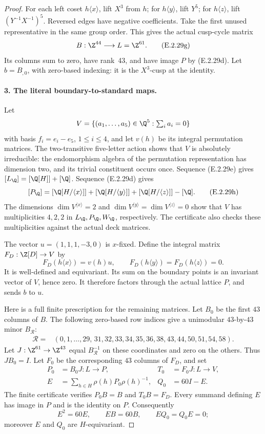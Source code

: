 \begin{proof}
For each left coset \(h\langle x\rangle\), lift \(X^3\)
from \(h\); for \(h\langle y\rangle\), lift \(Y^5\);
for \(h\langle z\rangle\), lift
\((Y^{-1}X^{-1})^5\). Reversed edges have negative
coefficients. Take the first unused representative in the
same group order. This gives the actual cusp-cycle matrix
\[
 B:\Z^{44}\longrightarrow L=\Z^{61}.
 \tag{E.2.29g}
\]
Its columns sum to zero, have rank~43, and have image \(P\)
by (E.2.29d). Let \(b=B_{\!,0}\), with zero-based indexing:
it is the \(X^3\)-cusp at the identity.

\paragraph{3. The literal boundary-to-standard maps.}
Let
\[
 V=\{(a_1,\ldots,a_5)\in\Q^5:\textstyle\sum_i a_i=0\}
\]
with basis \(f_i=e_i-e_5\), \(1\leq i\leq4\), and let
\(v(h)\) be its integral permutation matrices. The
two-transitive five-letter action shows that \(V\) is
absolutely irreducible: the endomorphism algebra of the
permutation representation has dimension two, and its
trivial constituent occurs once. Sequence (E.2.29e) gives
\([L_\Q]=[\Q[H]]+[\Q]\). Sequence (E.2.29d) gives
\[
 [P_\Q]=[\Q[H/\langle x\rangle]]
       +[\Q[H/\langle y\rangle]]
       +[\Q[H/\langle z\rangle]]-[\Q].
 \tag{E.2.29h}
\]
The dimensions \( \dim V^{\langle x\rangle}=2\) and
\(\dim V^{\langle y\rangle}=\dim V^{\langle z\rangle}=0\)
show that \(V\) has multiplicities \(4,2,2\) in
\(L_\Q,P_\Q,W_\Q\), respectively. The certificate also
checks these multiplicities against the actual deck matrices.

The vector \(u=(1,1,1,-3,0)\) is \(x\)-fixed. Define
the integral matrix \(F_D:\Z[D]\to V\) by
\[
 F_D(h\langle x\rangle)=v(h)u,\qquad
 F_D(h\langle y\rangle)=F_D(h\langle z\rangle)=0 .
 \tag{E.2.29i}
\]
It is well-defined and equivariant. Its sum on the boundary
points is an invariant vector of \(V\), hence zero. It
therefore factors through the actual lattice \(P\), and
sends \(b\) to \(u\).

Here is a full finite prescription for the remaining
matrices. Let \(B_0\) be the first \(43\) columns of \(B\).
The following zero-based row indices give a unimodular
\(43\)-by-\(43\) minor \(B_{\mathcal R}\):
\[
 \begin{aligned}
 \mathcal R={}&(0,1,\ldots,29,\,
 31,32,33,34,35,36,38,43,44,50,51,54,58).
 \end{aligned}
 \tag{E.2.29j}
\]
Let \(J:\Z^{61}\to\Z^{43}\) equal
\(B_{\mathcal R}^{-1}\) on these coordinates and zero on
the others. Thus \(JB_0=I\). Let \(F_0\) be the corresponding
\(43\) columns of \(F_D\), and set
\[
 \begin{aligned}
 P_0&=B_0J:L\longrightarrow P,&
 T_0&=F_0J:L\longrightarrow V,\\
 E&=\sum_{h\in H}\rho(h)P_0\rho(h)^{-1},&
 Q_0&=60I-E .
 \end{aligned}
 \tag{E.2.29k}
\]
The finite certificate verifies \(P_0B=B\) and \(T_0B=F_D\).
Every summand defining \(E\) has image in \(P\) and is
the identity on \(P\). Consequently
\[
 E^2=60E,\qquad EB=60B,\qquad EQ_0=Q_0E=0;
 \tag{E.2.29l}
\]
moreover \(E\) and \(Q_0\) are \(H\)-equivariant.


\end{proof}
